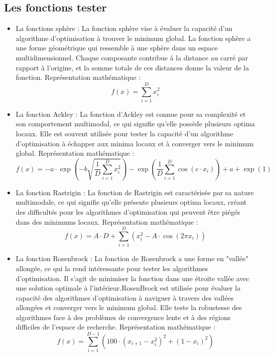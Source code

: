\documentclass[conference]{IEEEtran}
\begin{document}
\subsection{Les fonctions tester}
\begin{itemize}
    \item La fonctions sphère :  La fonction sphère vise à évaluer la capacité d'un algorithme d'optimisation à trouver le minimum global. La fonction sphère a une forme géométrique qui ressemble à une sphère dans un espace multidimensionnel. Chaque composante contribue à la distance au carré par rapport à l'origine, et la somme totale de ces distances donne la valeur de la fonction. Représentation mathématique : \[ f(x) =\sum_{i=1}^{D} x_i^2\]

    \item La fonction Ackley : La fonction d'Ackley est connue pour sa complexité et son comportement multimodal, ce qui signifie qu'elle possède plusieurs optima locaux. Elle est souvent utilisée pour tester la capacité d'un algorithme d'optimisation à échapper aux minima locaux et à converger vers le minimum global. Représentation mathématique :{\tiny \[f(x) = -a \cdot \exp\left(-b \sqrt{\frac{1}{D} \sum_{i=1}^{D} x_i^2}\right) - \exp\left(\frac{1}{D} \sum_{i=1}^{D} \cos(c \cdot x_i)\right) + a + \exp(1)\]}

    \item La fonction Rastrigin : La fonction de Rastrigin est caractérisée par sa nature multimodale, ce qui signifie qu'elle présente plusieurs optima locaux, créant des difficultés pour les algorithmes d'optimisation qui peuvent être piégés dans des minimums locaux. Représentation mathématique  :\[f(x) = A \cdot D + \sum_{i=1}^{D} \left( x_i^2 - A \cdot \cos(2\pi x_i) \right)\]
    
    \item La fonction Rosenbrock : La fonction de Rosenbrock a une forme en "vallée" allongée, ce qui la rend intéressante pour tester les algorithmes d'optimisation. Il s'agit de minimiser la fonction dans une étroite vallée avec une solution optimale à l'intérieur.RosenBrock est utilisée pour évaluer la capacité des algorithmes d'optimisation à naviguer à travers des vallées allongées et converger vers le minimum global. Elle teste la robustesse des algorithmes face à des problèmes de convergence lente et à des régions difficiles de l'espace de recherche. Représentation mathématique : \[f(x) = \sum_{i=1}^{D-1} \left( 100 \cdot (x_{i+1} - x_i^2)^2 + (1 - x_i)^2 \right)\]

\end{itemize}
\end{document}
